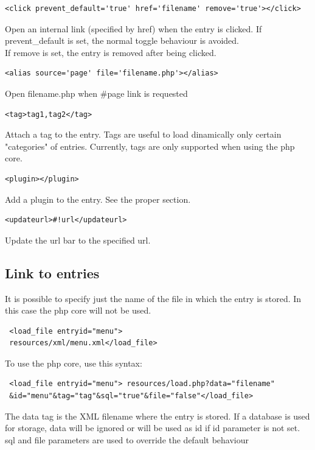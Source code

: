 \documentclass[a4paper,12pt]{article}
\begin{document}
\begin{list}{-}{}
\item \begin{verbatim}
<click prevent_default='true' href='filename' remove='true'></click>
\end{verbatim}
Open an internal link (specified by href) when the entry is clicked. If prevent\_default is set, the normal toggle behaviour is avoided.\\
If remove is set, the entry is removed after being clicked.
\item \begin{verbatim}
<alias source='page' file='filename.php'></alias>
\end{verbatim}
Open filename.php when \#page link is requested
\item \begin{verbatim}
<tag>tag1,tag2</tag>
\end{verbatim}
Attach a tag to the entry. Tags are useful to load dinamically only certain "categories" of entries. Currently, tags are only supported when using the php core.
\item \begin{verbatim}
<plugin></plugin>
\end{verbatim}
Add a plugin to the entry. See the proper section.
\item \begin{verbatim}
<updateurl>#!url</updateurl>
\end{verbatim}
Update the url bar to the specified url.
\end{list}
\normalsize
\subsection{Link to entries}
It is possible to specify just the name of the file in which the entry is stored. In this case the php core will not be used. 
\begin{verbatim}
 <load_file entryid="menu">
 resources/xml/menu.xml</load_file>
\end{verbatim}
To use the php core, use this syntax:
\begin{verbatim}
 <load_file entryid="menu"> resources/load.php?data="filename"
 &id="menu"&tag="tag"&sql="true"&file="false"</load_file>
\end{verbatim}
The data tag is the XML filename where the entry is stored. If a database is used for storage, data will be ignored or will be used as id if id parameter is not set.\\
sql and file parameters are used to override the default behaviour
\end{document}
